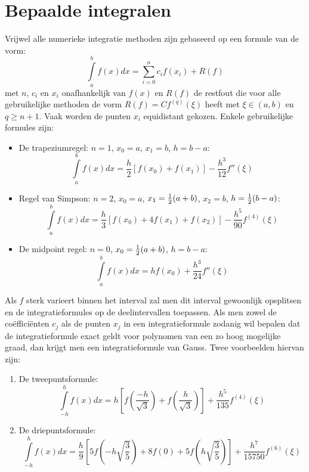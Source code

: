 \section{Bepaalde integralen}
Vrijwel alle numerieke integratie methoden zijn gebaseerd op een formule van
de vorm:
\[
\int\limits_a^bf(x)dx=\sum_{i=0}^nc_if(x_i)+R(f)
\]
met $n$, $c_i$ en $x_i$ onafhankelijk van $f(x)$ en $R(f)$ de restfout die
voor alle gebruikelijke methoden de vorm $R(f)=Cf^{(q)}(\xi)$ heeft met
$\xi\in(a,b)$ en $q\geq n+1$. Vaak worden de punten $x_i$ equidistant gekozen.
Enkele gebruikelijke formules zijn:
\begin{itemize}
\item De trapeziumregel: $n=1$, $x_0=a$, $x_1=b$, $h=b-a$:
\[
\int\limits_a^bf(x)dx=\frac{h}{2}[f(x_0)+f(x_1)]-\frac{h^3}{12}f''(\xi)
\]
\item Regel van Simpson: $n=2$, $x_0=a$, $x_1=\mbox{$\frac{1}{2}$}(a+b)$, $x_2=b$, $h=\mbox{$\frac{1}{2}$}(b-a)$:
\[
\int\limits_a^bf(x)dx=\frac{h}{3}[f(x_0)+4f(x_1)+f(x_2)]-\frac{h^5}{90}f^{(4)}(\xi)
\]
\item De midpoint regel: $n=0$, $x_0=\mbox{$\frac{1}{2}$}(a+b)$, $h=b-a$:
\[
\int\limits_a^bf(x)dx=hf(x_0)+\frac{h^3}{24}f''(\xi)
\]
\end{itemize}
Als $f$ sterk varieert binnen het interval zal men dit interval gewoonlijk
opsplitsen en de integratieformules op de deelintervallen toepassen.
\npar
Als men zowel de co\"effici\"enten $c_j$ als de punten $x_j$ in een
integratieformule zodanig wil bepalen dat de integratieformule exact geldt
voor polynomen van een zo hoog mogelijke graad, dan krijgt men een
integratieformule van Gauss. Twee voorbeelden hiervan zijn:
\begin{enumerate}
\item De tweepuntsformule:
\[
\int\limits_{-h}^hf(x)dx=h\left[f\left(\frac{-h}{\sqrt{3}}\right)+f\left(\frac{h}{\sqrt{3}}\right)\right]+\frac{h^5}{135}f^{(4)}(\xi)
\]
\item De driepuntsformule:
\[
\int\limits_{-h}^hf(x)dx=\frac{h}{9}\left[5f\left(-h\sqrt{\mbox{$\frac{3}{5}$}}\right)+8f(0)+5f\left(h\sqrt{\mbox{$\frac{3}{5}$}}\right)\right]+\frac{h^7}{15750}f^{(6)}(\xi)
\]
\end{enumerate}

